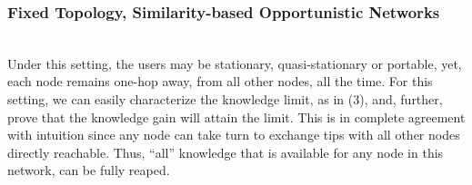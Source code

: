 \documentclass[12pt,epsf]{article}
\theoremstyle{definition}
\begin{document}
\subsubsection{Fixed Topology, Similarity-based Opportunistic Networks}
\vspace{-0.2 cm}
%
\\
Under this setting, the users may be stationary, quasi-stationary or portable, yet, each
node remains one-hop away, from all other nodes, all the time. 
For this setting, we can easily characterize the knowledge limit, as in (3), and, further, prove that the knowledge gain will attain the limit. This is in complete agreement with intuition since any node can take turn to exchange tips with all other nodes directly reachable. Thus, ``all'' knowledge that is available for any node in this network, can be fully reaped. 
%
\end{document}
